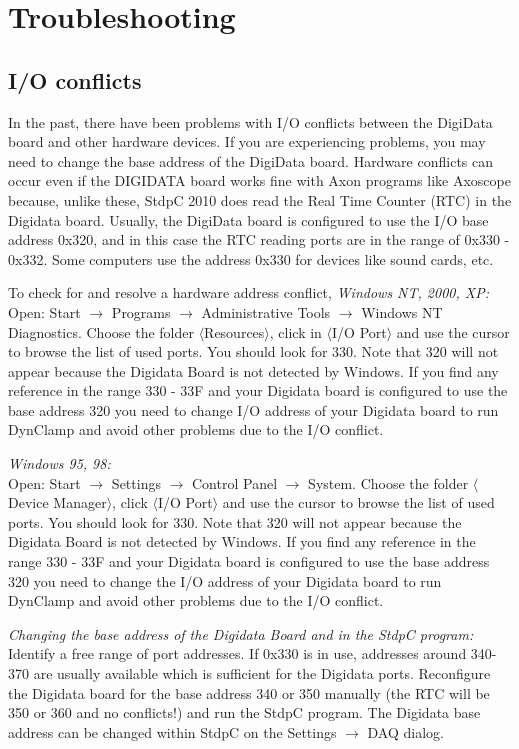 \documentclass{article}
\begin{document}
\section{Troubleshooting}
\subsection{I/O conflicts}
 
In the past, there have been problems with I/O conflicts between the
DigiData board and other hardware devices. If you are experiencing
problems, you may need to change the base address of the DigiData
board. Hardware conflicts can occur even if the DIGIDATA board works
fine with Axon programs like Axoscope because, unlike these, StdpC
2010 does read the Real Time Counter (RTC) in the Digidata
board. Usually, the DigiData board is configured to use the I/O base
address 0x320, and in this case the RTC reading ports are in the range
of 0x330 - 0x332. Some computers use the address 0x330 for devices like
sound cards, etc.

To check for and resolve a hardware address conflict,
\noindent
{\em Windows NT, 2000, XP: } \\
Open: Start $\rightarrow$ Programs $\rightarrow$ Administrative Tools
$\rightarrow$ Windows NT Diagnostics. Choose the folder
$\langle$Resources$\rangle$, click in $\langle$I/O Port$\rangle$ and use the
cursor to browse the list of used ports.  You should look for 330. Note that
320 will not appear because the Digidata Board is not detected by Windows. If
you find any reference in the range 330 - 33F and your Digidata board is
configured to use the base address 320 you need to change I/O address of your
Digidata board to run DynClamp and avoid other problems due to the I/O
conflict.

\noindent
{\em Windows 95, 98: } \\ Open: Start $\rightarrow$ Settings
$\rightarrow$ Control Panel $\rightarrow$ System. Choose the folder
$\langle$Device Manager$\rangle$, click $\langle$I/O Port$\rangle$ and
use the cursor to browse the list of used ports. You should look for
330.  Note that 320 will not appear because the Digidata Board is not
detected by Windows. If you find any reference in the range 330 - 33F
and your Digidata board is configured to use the base address 320 you
need to change the I/O address of your Digidata board to run DynClamp
and avoid other problems due to the I/O conflict.
 
\noindent
{\em Changing the base address of the Digidata Board and in the StdpC
  program: } \\ Identify a free range of port addresses.  If 0x330 is
in use, addresses around 340-370 are usually available which is
sufficient for the Digidata ports. Reconfigure the Digidata
board for the base address 340 or 350 manually (the RTC will be 350 or
360 and no conflicts!) and run the StdpC program. The Digidata base
address can be changed within StdpC on the Settings $\rightarrow$ DAQ dialog.
\end{document}
